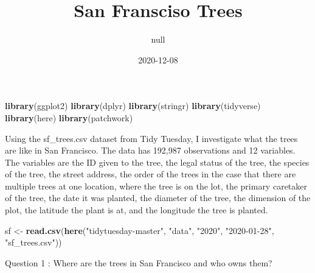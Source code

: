 \documentclass[
]{article}
\title{San Fransciso Trees}
\author{null}
\date{2020-12-08}
\newenvironment{Shaded}{\begin{snugshade}}{\end{snugshade}}
\newcommand{\KeywordTok}[1]{\textcolor[rgb]{0.13,0.29,0.53}{\textbf{#1}}}
\newcommand{\NormalTok}[1]{#1}
\newcommand{\StringTok}[1]{\textcolor[rgb]{0.31,0.60,0.02}{#1}}
\begin{document}
\maketitle

\begin{Shaded}
\begin{Highlighting}[]
\KeywordTok{library}\NormalTok{(ggplot2)}
\KeywordTok{library}\NormalTok{(dplyr)}
\KeywordTok{library}\NormalTok{(stringr)}
\KeywordTok{library}\NormalTok{(tidyverse)}
\KeywordTok{library}\NormalTok{(here)}
\KeywordTok{library}\NormalTok{(patchwork)}
\end{Highlighting}
\end{Shaded}

Using the sf\_trees.csv dataset from Tidy Tuesday, I investigate what
the trees are like in San Francisco. The data has 192,987 observations
and 12 variables. The variables are the ID given to the tree, the legal
status of the tree, the species of the tree, the street address, the
order of the trees in the case that there are multiple trees at one
location, where the tree is on the lot, the primary caretaker of the
tree, the date it was planted, the diameter of the tree, the dimension
of the plot, the latitude the plant is at, and the longitude the tree is
planted.

\begin{Shaded}
\begin{Highlighting}[]
\NormalTok{sf <-}\StringTok{ }\KeywordTok{read.csv}\NormalTok{(}\KeywordTok{here}\NormalTok{(}\StringTok{"tidytuesday-master"}\NormalTok{, }\StringTok{"data"}\NormalTok{, }\StringTok{"2020"}\NormalTok{, }\StringTok{"2020-01-28"}\NormalTok{, }\StringTok{"sf_trees.csv"}\NormalTok{))}
\end{Highlighting}
\end{Shaded}

Question 1 : Where are the trees in San Francisco and who owns them?
\end{document}
